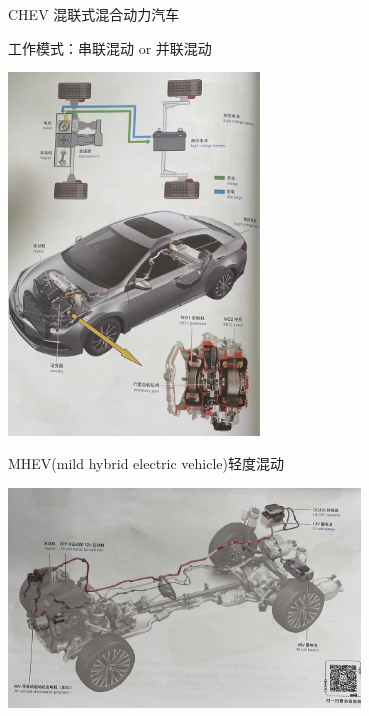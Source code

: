 \begin{frame}
	\begin{block}{}
		\begin{compactitem}
			\item  CHEV 混联式混合动力汽车
			
			工作模式：串联混动 or 并联混动
			\begin{center}
				\includegraphics[width=0.5\textwidth]{2-44}
			\end{center}
		\end{compactitem}
	\end{block}
\end{frame}
\begin{frame}
	\begin{block}{}
		\begin{compactitem}
			\item  MHEV(mild hybrid electric vehicle)轻度混动
			\begin{center}
				\includegraphics[width=0.7\textwidth]{2-45}
			\end{center}
		\end{compactitem}
	\end{block}
\end{frame}
